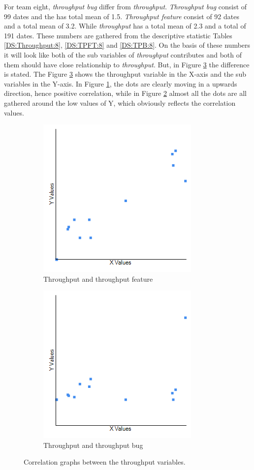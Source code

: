 \documentclass[UKenglish]{ifimaster}  %
\begin{document}
For team eight, \textit{throughput bug} differ from \textit{throughput}. \textit{Throughput bug} consist of 99 dates and the has total mean of 1.5. \textit{Throughput feature} consist of 92 dates and a total mean of 3.2. While \textit{throughput} has a total mean of 2.3 and a total of 191 dates. These numbers are gathered from the descriptive statistic Tables \ref{DS:Throughput:8}, \ref{DS:TPFT:8} and \ref{DS:TPB:8}.  On the basis of these numbers it will look like both of the sub variables of \textit{throughput} contributes and both of them should have close relationship to \textit{throughput}.  But, in Figure \ref{corr:Difference:8} the difference is stated. The Figure \ref{corr:Difference:8} shows the throughput variable in the X-axis and the sub variables in the Y-axis. In Figure \ref{fig:a:8}, the dots are clearly moving in a upwards direction, hence positive correlation, while in Figure \ref{fig:b:8} almost all the dots are all gathered around the low values of Y, which obviously reflects the correlation values.

\begin{figure}[h] 
  \begin{subfigure}[b]{0.5\textwidth}
  \center
\includegraphics[scale=0.5]{Picture/Eight/TPvsTPFT.png}
 \caption{Throughput and throughput feature} 
 \label{fig:a:8}
  \end{subfigure}
  \begin{subfigure}[b]{0.5\textwidth}
  \center
\includegraphics[scale=0.5]{Picture/Eight/TPvsTPB.png}
 \caption{Throughput and throughput bug} 
\label{fig:b:8}
  \end{subfigure}
\caption{Correlation graphs between the throughput variables.}
\label{corr:Difference:8}
\end{figure}
\end{document}
